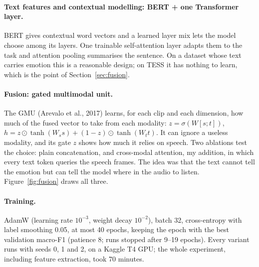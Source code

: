\documentclass[11pt,a4paper]{article}
\begin{document}
\paragraph{Text features and contextual modelling: BERT + one Transformer layer.} BERT gives contextual word
vectors and a learned layer mix lets the model choose among its layers. One trainable self-attention layer adapts
them to the task and attention pooling summarises the sentence. On a dataset whose text carries emotion this is a
reasonable design; on TESS it has nothing to learn, which is the point of Section~\ref{sec:fusion}.

\paragraph{Fusion: gated multimodal unit.} The GMU (Arevalo et al., 2017) learns, for each clip and each dimension,
how much of the fused vector to take from each modality: $z = \sigma(W[s;t])$,
$h = z \odot \tanh(W_s s) + (1-z) \odot \tanh(W_t t)$. It can ignore a useless modality, and its gate $z$ shows how
much it relies on speech. Two ablations test the choice: plain concatenation, and cross-modal attention, my
addition, in which every text token queries the speech frames. The idea was that the text cannot tell the
emotion but can tell the model where in the audio to listen. Figure~\ref{fig:fusion} draws all three.

\paragraph{Training.} AdamW (learning rate $10^{-3}$, weight decay $10^{-2}$), batch 32, cross-entropy with label
smoothing 0.05, at most 40 epochs, keeping the epoch with the best validation macro-F1 (patience 8; runs stopped
after 9--19 epochs). Every variant runs with seeds 0, 1 and 2, on a Kaggle T4 GPU; the whole experiment, including
feature extraction, took 70 minutes.
\end{document}
